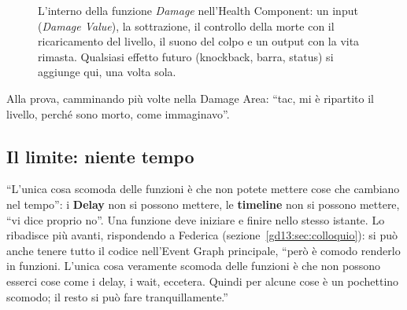 \begin{figure}[htbp]
\centering
{}
\caption{L'interno della funzione \emph{Damage} nell'Health Component: un input
(\emph{Damage Value}), la sottrazione, il controllo della morte con il
ricaricamento del livello, il suono del colpo e un output con la vita rimasta.
Qualsiasi effetto futuro (knockback, barra, status) si aggiunge qui, una volta
sola.}
\label{gd13:fig:damage-funzione}
\end{figure}

Alla prova, camminando più volte nella Damage Area: ``tac, mi è ripartito il
livello, perché sono morto, come immaginavo''.

\subsection{Il limite: niente tempo}

``L'unica cosa scomoda delle funzioni è che non potete mettere cose che cambiano
nel tempo'': i \textbf{Delay} non si possono mettere, le \textbf{timeline} non
si possono mettere, ``vi dice proprio no''. Una funzione deve iniziare e finire
nello stesso istante. Lo ribadisce più avanti, rispondendo a Federica
(sezione~\ref{gd13:sec:colloquio}): si può anche tenere tutto il codice
nell'Event Graph principale, ``però è comodo renderlo in funzioni. L'unica cosa
veramente scomoda delle funzioni è che non possono esserci cose come i delay, i
wait, eccetera. Quindi per alcune cose è un pochettino scomodo; il resto si può
fare tranquillamente.''

